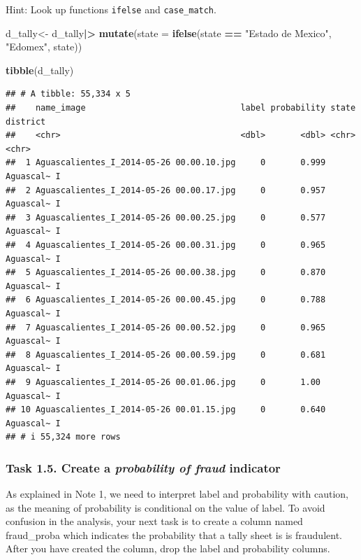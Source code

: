 \documentclass[
]{article}
\newenvironment{Shaded}{\begin{snugshade}}{\end{snugshade}}
\newcommand{\AttributeTok}[1]{\textcolor[rgb]{0.13,0.29,0.53}{#1}}
\newcommand{\FunctionTok}[1]{\textcolor[rgb]{0.13,0.29,0.53}{\textbf{#1}}}
\newcommand{\NormalTok}[1]{#1}
\newcommand{\OtherTok}[1]{\textcolor[rgb]{0.56,0.35,0.01}{#1}}
\newcommand{\SpecialCharTok}[1]{\textcolor[rgb]{0.81,0.36,0.00}{\textbf{#1}}}
\newcommand{\StringTok}[1]{\textcolor[rgb]{0.31,0.60,0.02}{#1}}
\begin{document}
Hint: Look up functions \texttt{ifelse} and \texttt{case\_match}.

\begin{Shaded}
\begin{Highlighting}[]
\NormalTok{d\_tally}\OtherTok{\textless{}{-}}\NormalTok{ d\_tally}\SpecialCharTok{|\textgreater{}}
  \FunctionTok{mutate}\NormalTok{(}\AttributeTok{state =} \FunctionTok{ifelse}\NormalTok{(state }\SpecialCharTok{==} \StringTok{"Estado de Mexico"}\NormalTok{, }\StringTok{"Edomex"}\NormalTok{, state))}

\FunctionTok{tibble}\NormalTok{(d\_tally)}
\end{Highlighting}
\end{Shaded}

\begin{verbatim}
## # A tibble: 55,334 x 5
##    name_image                               label probability state     district
##    <chr>                                    <dbl>       <dbl> <chr>     <chr>   
##  1 Aguascalientes_I_2014-05-26 00.00.10.jpg     0       0.999 Aguascal~ I       
##  2 Aguascalientes_I_2014-05-26 00.00.17.jpg     0       0.957 Aguascal~ I       
##  3 Aguascalientes_I_2014-05-26 00.00.25.jpg     0       0.577 Aguascal~ I       
##  4 Aguascalientes_I_2014-05-26 00.00.31.jpg     0       0.965 Aguascal~ I       
##  5 Aguascalientes_I_2014-05-26 00.00.38.jpg     0       0.870 Aguascal~ I       
##  6 Aguascalientes_I_2014-05-26 00.00.45.jpg     0       0.788 Aguascal~ I       
##  7 Aguascalientes_I_2014-05-26 00.00.52.jpg     0       0.965 Aguascal~ I       
##  8 Aguascalientes_I_2014-05-26 00.00.59.jpg     0       0.681 Aguascal~ I       
##  9 Aguascalientes_I_2014-05-26 00.01.06.jpg     0       1.00  Aguascal~ I       
## 10 Aguascalientes_I_2014-05-26 00.01.15.jpg     0       0.640 Aguascal~ I       
## # i 55,324 more rows
\end{verbatim}

\clearpage

\hypertarget{task-1.5.-create-a-probability-of-fraud-indicator}{%
\subsubsection{\texorpdfstring{Task 1.5. Create a \emph{probability of
fraud}
indicator}{Task 1.5. Create a probability of fraud indicator}}\label{task-1.5.-create-a-probability-of-fraud-indicator}}

As explained in Note 1, we need to interpret label and probability with
caution, as the meaning of probability is conditional on the value of
label. To avoid confusion in the analysis, your next task is to create a
column named fraud\_proba which indicates the probability that a tally
sheet is is fraudulent. After you have created the column, drop the
label and probability columns.
\end{document}
